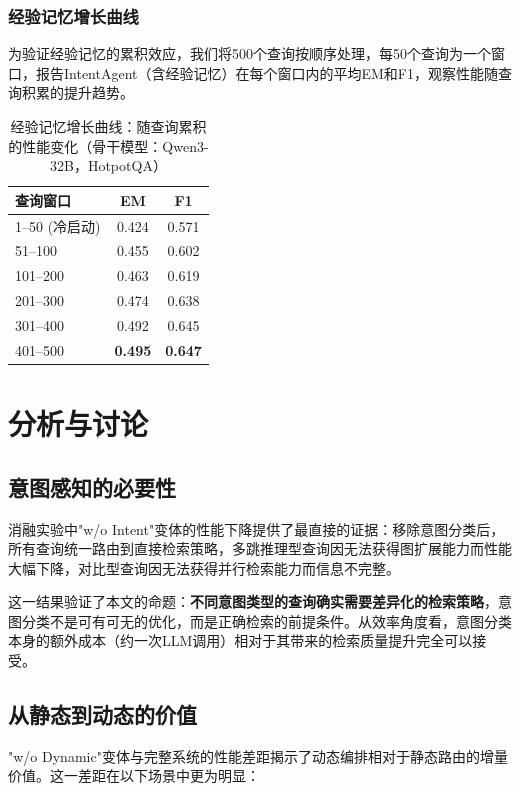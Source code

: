 \documentclass[runningheads]{llncs}
\begin{document}
\subsubsection{经验记忆增长曲线}

为验证经验记忆的累积效应，我们将500个查询按顺序处理，每50个查询为一个窗口，报告IntentAgent（含经验记忆）在每个窗口内的平均EM和F1，观察性能随查询积累的提升趋势。

\begin{table}[htbp]
\centering
\caption{经验记忆增长曲线：随查询累积的性能变化（骨干模型：Qwen3-32B，HotpotQA）}
\label{tab:memory_growth}
\begin{tabular}{l|cc}
\toprule
\textbf{查询窗口} & \textbf{EM} & \textbf{F1} \\
\midrule
1--50 (冷启动) & 0.424 & 0.571 \\
51--100 & 0.455 & 0.602 \\
101--200 & 0.463 & 0.619 \\
201--300 & 0.474 & 0.638 \\
301--400 & 0.492 & 0.645 \\
401--500 & \textbf{0.495} & \textbf{0.647} \\
\bottomrule
\end{tabular}
\end{table}

\section{分析与讨论}

\subsection{意图感知的必要性}

消融实验中"w/o Intent"变体的性能下降提供了最直接的证据：移除意图分类后，所有查询统一路由到直接检索策略，多跳推理型查询因无法获得图扩展能力而性能大幅下降，对比型查询因无法获得并行检索能力而信息不完整。

这一结果验证了本文的命题：\textbf{不同意图类型的查询确实需要差异化的检索策略}，意图分类不是可有可无的优化，而是正确检索的前提条件。从效率角度看，意图分类本身的额外成本（约一次LLM调用）相对于其带来的检索质量提升完全可以接受。

\subsection{从静态到动态的价值}

"w/o Dynamic"变体与完整系统的性能差距揭示了动态编排相对于静态路由的增量价值。这一差距在以下场景中更为明显：
\end{document}
